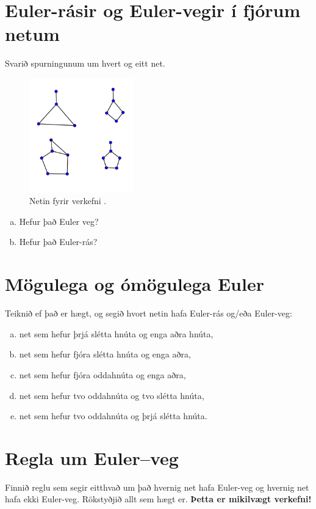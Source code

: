 \documentclass[b5paper,12pt]{book}
\renewcommand*\thesection{\arabic{section}}
\begin{document}
\section{Euler-rásir og Euler-vegir í fjórum netum} Svarið spurningunum um hvert og eitt net.

\begin{figure}[h]
  \includegraphics[width=0.4\textwidth, center]{Eulerspurning2.png}
  \caption*{Netin fyrir verkefni \thesection{}.}
\end{figure}

\begin{enumerate}[(a)]
\item Hefur það Euler veg?
\item Hefur það Euler-rás?
\end{enumerate}

\section{Mögulega og ómögulega Euler}
Teiknið ef það er hægt, og segið hvort netin hafa Euler-rás og/eða Euler-veg:
\begin{enumerate}[(a)]
\item net sem hefur þrjá slétta hnúta og enga aðra hnúta,
\item net sem hefur fjóra slétta hnúta og enga aðra,
\item net sem hefur fjóra oddahnúta og enga aðra,
\item net sem hefur tvo oddahnúta og tvo slétta hnúta,
\item net sem hefur tvo oddahnúta og þrjá slétta hnúta.
\end{enumerate}

\section{Regla um Euler--veg}
Finnið reglu sem segir eitthvað um það hvernig net hafa Euler-veg og hvernig net hafa ekki Euler-veg. Rökstyðjið allt sem hægt er. \textbf{Þetta er mikilvægt verkefni!}
\end{document}
